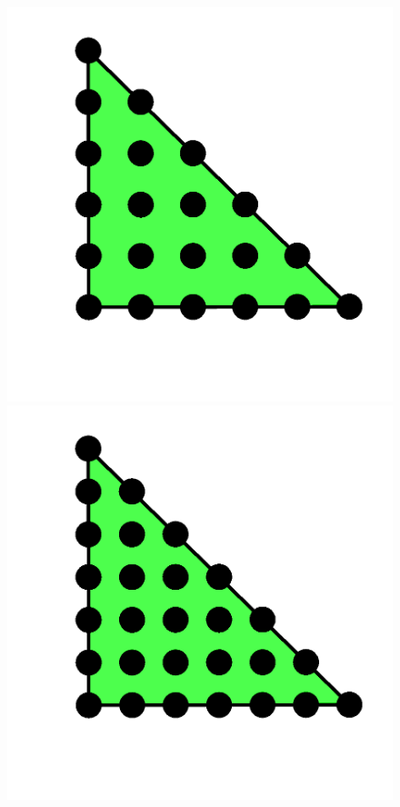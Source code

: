\begin{figure}
{   \includegraphics[width=\threefigsfull]{chapters/kirby-6/png/CG5_2d.png}
   \includegraphics[width=\threefigsfull]{chapters/kirby-6/png/CG6_2d.png}}
\end{figure}


